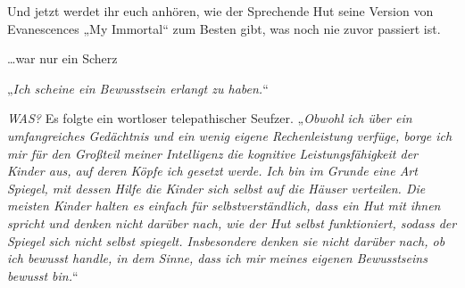 
\begin{chapterOpeningAuthorNote}
% 
Und jetzt werdet ihr euch anhören, wie der Sprechende Hut seine Version von Evanescences „My Immortal“ zum Besten gibt, was noch nie zuvor passiert ist.

…war nur ein Scherz
\end{chapterOpeningAuthorNote}


\hplettrineextrapara
„\emph{Ich scheine ein Bewusstsein erlangt zu haben.}“

\emph{WAS?}
Es folgte ein wortloser telepathischer Seufzer. „\emph{Obwohl ich über ein umfangreiches Gedächtnis und ein wenig eigene Rechenleistung verfüge, borge ich mir für den Großteil meiner Intelligenz die kognitive Leistungsfähigkeit der Kinder aus, auf deren Köpfe ich gesetzt werde. Ich bin im Grunde eine Art Spiegel, mit dessen Hilfe die Kinder \emph{sich selbst} auf die Häuser verteilen. Die meisten Kinder halten es einfach für selbstverständlich, dass ein Hut mit ihnen spricht und denken nicht darüber nach, wie der Hut \emph{selbst} funktioniert, sodass der Spiegel sich nicht selbst spiegelt. \emph{Insbesondere} denken sie nicht darüber nach, ob ich bewusst handle, in dem Sinne, dass ich mir meines eigenen Bewusstseins bewusst bin.}“

